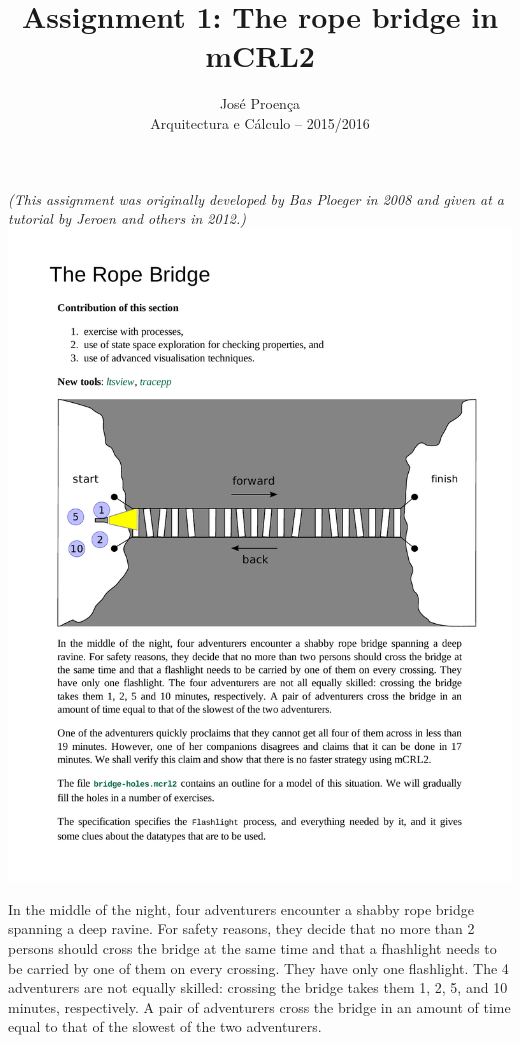\documentclass[11pt]{article}
\theoremstyle{myplain}
\theoremstyle{definition} %
\begin{document}
 
 
\title{Assignment 1: The rope bridge in mCRL2}
\author{Jos\'{e} Proen\c{c}a\\
Arquitectura e C\'alculo -- 2015/2016} 
 
\maketitle

\noindent
\emph{(This assignment was originally developed by Bas Ploeger in 2008 and given at a tutorial by Jeroen and others in 2012.)}
\\[3mm]
%
\includegraphics[width=\textwidth]{images/ropebridge-diag}


In the middle of the night, four adventurers encounter a shabby rope bridge spanning a deep ravine. For safety reasons, they decide that no more than 2 persons should cross the bridge at the same time and that a fhashlight needs to be carried by one of them on every crossing.
They have only one flashlight. The 4 adventurers are not equally skilled: crossing the bridge takes them 1, 2, 5, and 10 minutes, respectively. A pair of adventurers cross the bridge in an amount of time equal to that of the slowest of the two adventurers.
\end{document}
